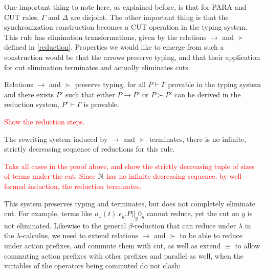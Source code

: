 One important thing to note here, as explained before, is that for PARA and CUT rules, $\Gamma$ and $\Delta$ are disjoint. The other important thing is that the synchronization construction becomes a CUT operation in the typing system. This rule has elimination transformations, given by the relations $\to$ and $\succ$ defined in \ref{reduction}. Properties we would like to emerge from such a construction would be that the arrows preserve typing, and that their application for cut elimination terminates and actually eliminates cuts.

\begin{proposition}
Relations $\to$ and $\succ$ preserve typing, \ie for all $P\vdash\Gamma$ provable in the typing system and there exists $P'$ such that either $P\to P'$ or $P\succ P'$ can be derived in the reduction system, $P'\vdash\Gamma$ is provable.
\end{proposition}

\begin{myproof}
\textcolor{red}{Show the reduction steps.} %
\end{myproof}

\begin{proposition}
The rewriting system induced by $\to$ and $\succ$ terminates, \ie there is no infinite, strictly decreasing sequence of reductions for this rule.
\end{proposition}

\begin{myproof}
\textcolor{red}{Take all cases in the proof above, and show the strictly decreasing tuple of sizes of terms under the cut. Since $\mathbb{N}$ has no infinite decreasing sequence, by well formed induction, the reduction terminates.} %
\end{myproof}

\remark This system preserves typing and terminates, but does not completely eliminate cut. For example, terms like $u_x(t).\epsilon_y.P ||_y 0_y$ cannot reduce, yet the cut on $y$ is not eliminated. Likewise to the general $\beta$-reduction that can reduce under $\lambda$ in the $\lambda$-calculus, we need to extend relations $\to$ and $\succ$ to be able to reduce under action prefixes, and commute them with cut, as well as extend $\equiv$ to allow commuting action prefixes with other prefixes and parallel as well, when the variables of the operators being commuted do not clash:

